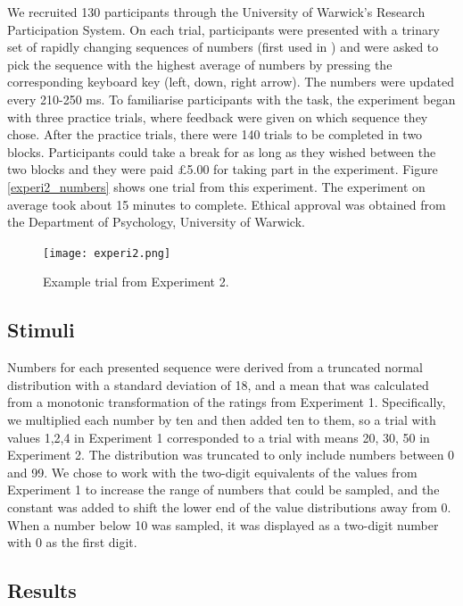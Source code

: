 \documentclass[11pt,a4paper]{article}
\begin{document}
We recruited 130 participants through the University of Warwick's Research Participation System. On each trial, participants were presented with a trinary set of rapidly changing sequences of numbers (first used in \citeauthor{Tsetsos2012a}) and were asked to pick the sequence with the highest average of numbers by pressing the corresponding keyboard key (left, down, right arrow). The numbers were updated every 210-250 ms. To familiarise participants with the task, the experiment began with three practice trials, where feedback were given on which sequence they chose. After the practice trials, there were 140 trials to be completed in two blocks. Participants could take a break for as long as they wished between the two blocks and they were paid £5.00 for taking part in the experiment. Figure \ref{experi2_numbers} shows one trial from this experiment. The experiment on average took about 15 minutes to complete. Ethical approval was obtained from the Department of Psychology, University of Warwick.

\begin{figure}
\captionsetup{justification=centering}
\centering
\caption{Example trial from Experiment 2.}
\texttt{[image: experi2.png]}
\label{fig:experi2_numbers}
\end{figure}

\subsection{Stimuli}

Numbers for each presented sequence were derived from a truncated normal distribution with a standard deviation of 18, and a mean that was calculated from a monotonic transformation of the ratings from Experiment 1. Specifically, we multiplied each number by ten and then added ten to them, so a trial with values 1,2,4 in Experiment 1 corresponded to a trial with means 20, 30, 50 in Experiment 2. The distribution was truncated to only include numbers between 0 and 99. We chose to work with the two-digit equivalents of the values from Experiment 1 to increase the range of numbers that could be sampled, and the constant was added to shift the lower end of the value distributions away from 0. When a number below 10 was sampled, it was displayed as a two-digit number with 0 as the first digit. 


\subsection{Results}
\end{document}
